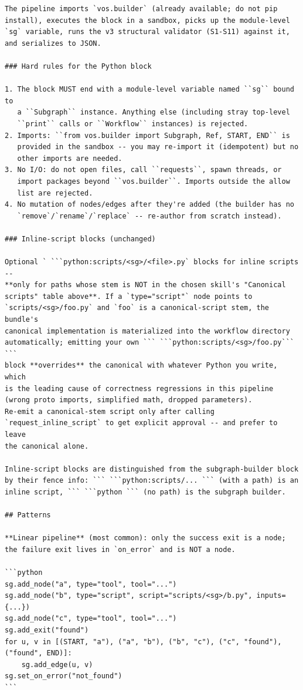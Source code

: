 \begin{lstlisting}
The pipeline imports `vos.builder` (already available; do not pip
install), executes the block in a sandbox, picks up the module-level
`sg` variable, runs the v3 structural validator (S1-S11) against it,
and serializes to JSON.

### Hard rules for the Python block

1. The block MUST end with a module-level variable named ``sg`` bound to
   a ``Subgraph`` instance. Anything else (including stray top-level
   ``print`` calls or ``Workflow`` instances) is rejected.
2. Imports: ``from vos.builder import Subgraph, Ref, START, END`` is
   provided in the sandbox -- you may re-import it (idempotent) but no
   other imports are needed.
3. No I/O: do not open files, call ``requests``, spawn threads, or
   import packages beyond ``vos.builder``. Imports outside the allow
   list are rejected.
4. No mutation of nodes/edges after they're added (the builder has no
   `remove`/`rename`/`replace` -- re-author from scratch instead).

### Inline-script blocks (unchanged)

Optional ` ```python:scripts/<sg>/<file>.py` blocks for inline scripts --
**only for paths whose stem is NOT in the chosen skill's "Canonical
scripts" table above**. If a `type="script"` node points to
`scripts/<sg>/foo.py` and `foo` is a canonical-script stem, the bundle's
canonical implementation is materialized into the workflow directory
automatically; emitting your own ``` ```python:scripts/<sg>/foo.py``` ```
block **overrides** the canonical with whatever Python you write, which
is the leading cause of correctness regressions in this pipeline
(wrong proto imports, simplified math, dropped parameters).
Re-emit a canonical-stem script only after calling
`request_inline_script` to get explicit approval -- and prefer to leave
the canonical alone.

Inline-script blocks are distinguished from the subgraph-builder block
by their fence info: ``` ```python:scripts/... ``` (with a path) is an
inline script, ``` ```python ``` (no path) is the subgraph builder.

## Patterns

**Linear pipeline** (most common): only the success exit is a node;
the failure exit lives in `on_error` and is NOT a node.

```python
sg.add_node("a", type="tool", tool="...")
sg.add_node("b", type="script", script="scripts/<sg>/b.py", inputs={...})
sg.add_node("c", type="tool", tool="...")
sg.add_exit("found")
for u, v in [(START, "a"), ("a", "b"), ("b", "c"), ("c", "found"), ("found", END)]:
    sg.add_edge(u, v)
sg.set_on_error("not_found")
```


\end{lstlisting}

